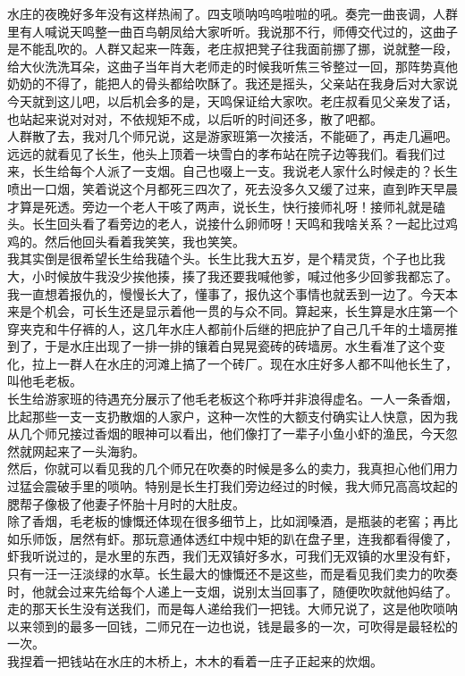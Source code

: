 水庄的夜晚好多年没有这样热闹了。四支唢呐呜呜啦啦的吼。奏完一曲丧调，人群里有人喊说天鸣整一曲百鸟朝凤给大家听听。我说那不行，师傅交代过的，这曲子是不能乱吹的。人群又起来一阵轰，老庄叔把凳子往我面前挪了挪，说就整一段，给大伙洗洗耳朵，这曲子当年肖大老师走的时候我听焦三爷整过一回，那阵势真他奶奶的不得了，能把人的骨头都给吹酥了。我还是摇头，父亲站在我身后对大家说今天就到这儿吧，以后机会多的是，天鸣保证给大家吹。老庄叔看见父亲发了话，也站起来说对对对，不依规矩不成，以后听的时间还多，散了吧都。\\

人群散了去，我对几个师兄说，这是游家班第一次接活，不能砸了，再走几遍吧。\\

远远的就看见了长生，他头上顶着一块雪白的孝布站在院子边等我们。看我们过来，长生给每个人派了一支烟。自己也啜上一支。我说老人家什么时候走的？长生喷出一口烟，笑着说这个月都死三四次了，死去没多久又缓了过来，直到昨天早晨才算是死透。旁边一个老人干咳了两声，说长生，快行接师礼呀！接师礼就是磕头。长生回头看了看旁边的老人，说接什么卵师呀！天鸣和我啥关系？一起比过鸡鸡的。然后他回头看着我笑笑，我也笑笑。\\

我其实倒是很希望长生给我磕个头。长生比我大五岁，是个精灵货，个子也比我大，小时候放牛我没少挨他揍，揍了我还要我喊他爹，喊过他多少回爹我都忘了。我一直想着报仇的，慢慢长大了，懂事了，报仇这个事情也就丢到一边了。今天本来是个机会，可长生还是显示着他一贯的与众不同。算起来，长生算是水庄第一个穿夹克和牛仔裤的人，这几年水庄人都前仆后继的把庇护了自己几千年的土墙房推到了，于是水庄出现了一排一排的镶着白晃晃瓷砖的砖墙房。水生看准了这个变化，拉上一群人在水庄的河滩上搞了一个砖厂。现在水庄好多人都不叫他长生了，叫他毛老板。\\

长生给游家班的待遇充分展示了他毛老板这个称呼并非浪得虚名。一人一条香烟，比起那些一支一支扔散烟的人家户，这种一次性的大额支付确实让人快意，因为我从几个师兄接过香烟的眼神可以看出，他们像打了一辈子小鱼小虾的渔民，今天忽然就网起来了一头海豹。\\

然后，你就可以看见我的几个师兄在吹奏的时候是多么的卖力，我真担心他们用力过猛会震破手里的唢呐。特别是长生打我们旁边经过的时候，我大师兄高高坟起的腮帮子像极了他妻子怀胎十月时的大肚皮。\\

除了香烟，毛老板的慷慨还体现在很多细节上，比如润嗓酒，是瓶装的老窖；再比如乐师饭，居然有虾。那玩意通体透红中规中矩的趴在盘子里，连我都看得傻了，虾我听说过的，是水里的东西，我们无双镇好多水，可我们无双镇的水里没有虾，只有一汪一汪淡绿的水草。长生最大的慷慨还不是这些，而是看见我们卖力的吹奏时，他就会过来先给每个人递上一支烟，说别太当回事了，随便吹吹就他妈结了。\\

走的那天长生没有送我们，而是每人递给我们一把钱。大师兄说了，这是他吹唢呐以来领到的最多一回钱，二师兄在一边也说，钱是最多的一次，可吹得是最轻松的一次。\\

我捏着一把钱站在水庄的木桥上，木木的看着一庄子正起来的炊烟。\\